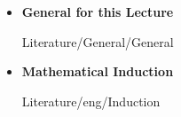 \begin{itemize}
  \item
    \textbf{General for this Lecture}
    \begin{btSect}{Literature/General/General}
      \btPrintAll
    \end{btSect}
\end{itemize}
\newpage
\begin{itemize}
  \item
    \textbf{Mathematical Induction}
    \begin{btSect}{Literature/eng/Induction}
      \btPrintAll
    \end{btSect}
\end{itemize}